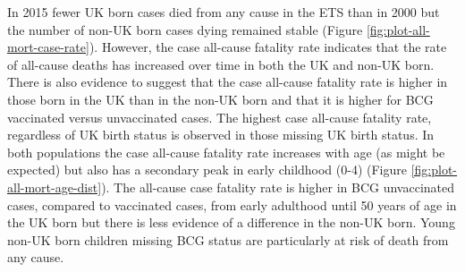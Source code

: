\documentclass[11pt,twoside]{bristolthesis}
\begin{document}
  In 2015 fewer UK born cases died from any cause in the ETS than in 2000 but the number of non-UK born cases dying remained stable (Figure \ref{fig:plot-all-mort-case-rate}). However, the case all-cause fatality rate indicates that the rate of all-cause deaths has increased over time in both the UK and non-UK born. There is also evidence to suggest that the case all-cause fatality rate is higher in those born in the UK than in the non-UK born and that it is higher for BCG vaccinated versus unvaccinated cases. The highest case all-cause fatality rate, regardless of UK birth status is observed in those missing UK birth status. In both populations the case all-cause fatality rate increases with age (as might be expected) but also has a secondary peak in early childhood (0-4) (Figure \ref{fig:plot-all-mort-age-dist}). The all-cause case fatality rate is higher in BCG unvaccinated cases, compared to vaccinated cases, from early adulthood until 50 years of age in the UK born but there is less evidence of a difference in the non-UK born. Young non-UK born children missing BCG status are particularly at risk of death from any cause.
\end{document}
